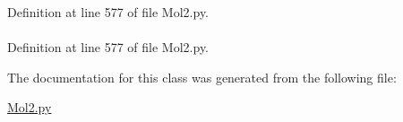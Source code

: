 \-Definition at line 577 of file \-Mol2.\-py.

\hypertarget{classforcebalance_1_1Mol2_1_1mol2__set_a5d75e29483932c00c5f2c93a5f9406ba}{
\paragraph[{num\-\_\-compounds}]{}}\label{classforcebalance_1_1Mol2_1_1mol2__set_a5d75e29483932c00c5f2c93a5f9406ba}


\-Definition at line 577 of file \-Mol2.\-py.



\-The documentation for this class was generated from the following file\-:\begin{DoxyCompactItemize}
\item 
\hyperlink{Mol2_8py}{\-Mol2.\-py}\end{DoxyCompactItemize}
